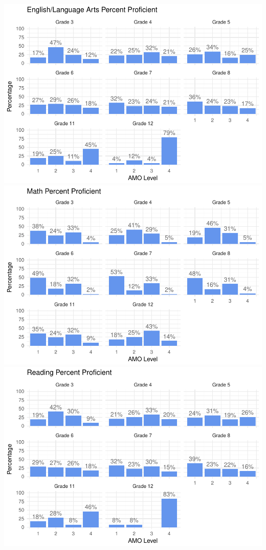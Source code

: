 \documentclass[]{article}
\begin{document}
\clearpage

\includegraphics{tech_report_18_files/figure-latex/amo_plot-1.pdf}
\includegraphics{tech_report_18_files/figure-latex/amo_plot-2.pdf}
\includegraphics{tech_report_18_files/figure-latex/amo_plot-3.pdf}
\end{document}
